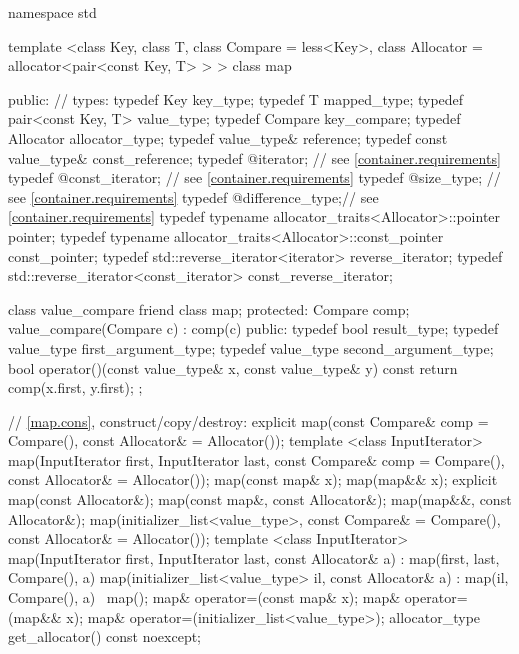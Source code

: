 \begin{codeblock}
namespace std {
  template <class Key, class T, class Compare = less<Key>,
            class Allocator = allocator<pair<const Key, T> > >
  class map {
  public:
    // types:
    typedef Key                                   key_type;
    typedef T                                     mapped_type;
    typedef pair<const Key, T>                    value_type;
    typedef Compare                               key_compare;
    typedef Allocator                             allocator_type;
    typedef value_type&                           reference;
    typedef const value_type&                     const_reference;
    typedef @\impdef@                iterator;       // see \ref{container.requirements}
    typedef @\impdef@                const_iterator; // see \ref{container.requirements}
    typedef @\impdef@                size_type;      // see \ref{container.requirements}
    typedef @\impdef@                difference_type;// see \ref{container.requirements}
    typedef typename allocator_traits<Allocator>::pointer           pointer;
    typedef typename allocator_traits<Allocator>::const_pointer     const_pointer;
    typedef std::reverse_iterator<iterator>       reverse_iterator;
    typedef std::reverse_iterator<const_iterator> const_reverse_iterator;

    class value_compare {
    friend class map;
    protected:
      Compare comp;
      value_compare(Compare c) : comp(c) {}
    public:
      typedef bool result_type;
      typedef value_type first_argument_type;
      typedef value_type second_argument_type;
      bool operator()(const value_type& x, const value_type& y) const {
        return comp(x.first, y.first);
      }
    };

    // \ref{map.cons}, construct/copy/destroy:
    explicit map(const Compare& comp = Compare(),
                 const Allocator& = Allocator());
    template <class InputIterator>
      map(InputIterator first, InputIterator last,
          const Compare& comp = Compare(), const Allocator& = Allocator());
    map(const map& x);
    map(map&& x);
    explicit map(const Allocator&);
    map(const map&, const Allocator&);
    map(map&&, const Allocator&);
    map(initializer_list<value_type>,
      const Compare& = Compare(),
      const Allocator& = Allocator());
    template <class InputIterator>
    map(InputIterator first, InputIterator last, const Allocator& a)
      : map(first, last, Compare(), a) { }
    map(initializer_list<value_type> il, const Allocator& a)
      : map(il, Compare(), a) { }
   ~map();
    map& operator=(const map& x);
    map& operator=(map&& x);
    map& operator=(initializer_list<value_type>);
    allocator_type get_allocator() const noexcept;

}}
\end{codeblock}
